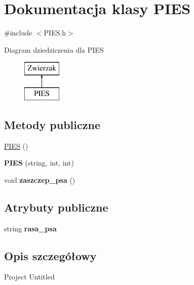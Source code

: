 \hypertarget{class_p_i_e_s}{}\section{Dokumentacja klasy P\+I\+ES}
\label{class_p_i_e_s}


{\ttfamily \#include $<$P\+I\+E\+S.\+h$>$}

Diagram dziedziczenia dla P\+I\+ES\begin{figure}[H]
\begin{center}
\leavevmode
\includegraphics[height=2.000000cm]{class_p_i_e_s}
\end{center}
\end{figure}
\subsection*{Metody publiczne}
\begin{DoxyCompactItemize}
\item 
\hyperlink{class_p_i_e_s_aa11f80bdbaee36f20c312b6f17fc7f9c}{P\+I\+ES} ()
\item 
{\bfseries P\+I\+ES} (string, int, int)\hypertarget{class_p_i_e_s_aa24a5012c7396d03ad506a430bfec167}{}\label{class_p_i_e_s_aa24a5012c7396d03ad506a430bfec167}

\item 
void {\bfseries zaszczep\+\_\+psa} ()\hypertarget{class_p_i_e_s_a59254ad3c8094174cb7d1b0fe330b4b2}{}\label{class_p_i_e_s_a59254ad3c8094174cb7d1b0fe330b4b2}

\end{DoxyCompactItemize}
\subsection*{Atrybuty publiczne}
\begin{DoxyCompactItemize}
\item 
string {\bfseries rasa\+\_\+psa}\hypertarget{class_p_i_e_s_a12202e02d4945d1ffda8770e86571df6}{}\label{class_p_i_e_s_a12202e02d4945d1ffda8770e86571df6}

\end{DoxyCompactItemize}


\subsection{Opis szczegółowy}
Project Untitled 


